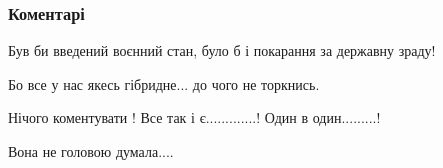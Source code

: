 
 
 
 
 
\subsubsection{Коментарі}

\begin{itemize}
 
Був би введений воєнний стан, було б і покарання за державну зраду!

 
Бо все у нас якесь гібридне... до чого не торкнись.

 
Нічого коментувати !
Все так і є.............!
Один в один.........!

 
Вона не головою думала....

 


\end{itemize}

